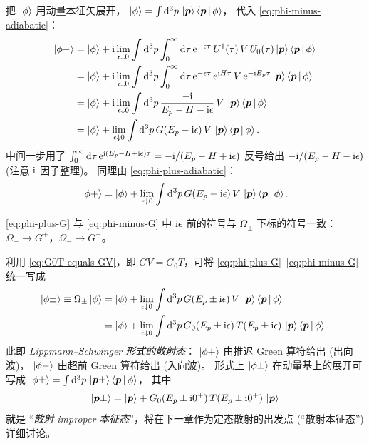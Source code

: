 把 $\ket\phi$ 用动量本征矢展开，
$\ket\phi = \int\mathrm{d}^3 p\,\ket{\bm p}\left\langle \bm p \,\middle|\, \phi \right\rangle$，
代入 \eqref{eq:phi-minus-adiabatic}：
\begin{align}
  \ket{\phi-}
  &= \ket\phi + \mathrm{i}\lim_{\epsilon\downarrow 0}\int\mathrm{d}^3 p\int_0^{\infty}\mathrm{d}\tau\,
     \mathrm{e}^{-\epsilon\tau}\,U^\dagger(\tau)\,V\,U_0(\tau)\ket{\bm p}\left\langle \bm p \,\middle|\, \phi \right\rangle\notag\\
  &= \ket\phi + \mathrm{i}\lim_{\epsilon\downarrow 0}\int\mathrm{d}^3 p\int_0^{\infty}\mathrm{d}\tau\,
     \mathrm{e}^{-\epsilon\tau}\,\mathrm{e}^{\mathrm{i} H\tau}\,V\,
     \mathrm{e}^{-\mathrm{i} E_p \tau}\ket{\bm p}\left\langle \bm p \,\middle|\, \phi \right\rangle\notag\\
  &= \ket\phi + \mathrm{i}\lim_{\epsilon\downarrow 0}\int\mathrm{d}^3 p\,
     \frac{-\mathrm{i}}{E_p - H -\mathrm{i}\epsilon}\,V\,\ket{\bm p}\left\langle \bm p \,\middle|\, \phi \right\rangle\notag\\
  &= \ket\phi + \lim_{\epsilon\downarrow 0}\int\mathrm{d}^3 p\,
     G(E_p-\mathrm{i}\epsilon)\,V\,\ket{\bm p}\left\langle \bm p \,\middle|\, \phi \right\rangle.\label{eq:phi-minus-G}
\end{align}
中间一步用了 $\int_0^\infty\mathrm{d}\tau\,\mathrm{e}^{\mathrm{i}(E_p-H+\mathrm{i}\epsilon)\tau}
=-\mathrm{i}/(E_p-H+\mathrm{i}\epsilon)$ 反号给出 $-\mathrm{i}/(E_p-H-\mathrm{i}\epsilon)$
(注意 $\mathrm{i}$ 因子整理)。
同理由 \eqref{eq:phi-plus-adiabatic}：
\begin{equation}\label{eq:phi-plus-G}
  \ket{\phi+} = \ket\phi + \lim_{\epsilon\downarrow 0}\int\mathrm{d}^3 p\,
     G(E_p+\mathrm{i}\epsilon)\,V\,\ket{\bm p}\left\langle \bm p \,\middle|\, \phi \right\rangle.
\end{equation}

\begin{remark}
\eqref{eq:phi-plus-G} 与 \eqref{eq:phi-minus-G} 中
$\mathrm{i}\epsilon$ 前的符号与 $\Omega_\pm$ 下标的符号一致：
$\Omega_+\to G^+$，$\Omega_-\to G^-$。
\end{remark}

利用 \eqref{eq:G0T-equals-GV}，即 $GV=G_0 T$，可将 \eqref{eq:phi-plus-G}--\eqref{eq:phi-minus-G}
统一写成
\begin{align}
  \ket{\phi\pm} \equiv \Omega_\pm\ket\phi
  &= \ket\phi + \lim_{\epsilon\downarrow 0}\int\mathrm{d}^3 p\,
     G(E_p\pm\mathrm{i}\epsilon)\,V\,\ket{\bm p}\left\langle \bm p \,\middle|\, \phi \right\rangle\notag\\
  &= \ket\phi + \lim_{\epsilon\downarrow 0}\int\mathrm{d}^3 p\,
     G_0(E_p\pm\mathrm{i}\epsilon)\,T(E_p\pm\mathrm{i}\epsilon)\,\ket{\bm p}\left\langle \bm p \,\middle|\, \phi \right\rangle.
\label{eq:phi-pm-T}
\end{align}
此即 \emph{Lippmann--Schwinger 形式的散射态}：
$\ket{\phi+}$ 由推迟 Green 算符给出 (出向波)，
$\ket{\phi-}$ 由超前 Green 算符给出 (入向波)。
形式上 $\ket{\phi\pm}$ 在动量基上的展开可写成
$\ket{\phi\pm}=\int\mathrm{d}^3 p\,\ket{\bm p\pm}\left\langle \bm p \,\middle|\, \phi \right\rangle$，
其中
\begin{equation}\label{eq:improper-pm-states}
  \ket{\bm p\pm}
  = \ket{\bm p} + G_0(E_p\pm\mathrm{i} 0^+)\,T(E_p\pm\mathrm{i} 0^+)\,\ket{\bm p}
\end{equation}
就是 ``\emph{散射 improper 本征态}''，将在下一章作为定态散射的出发点
(``散射本征态'') 详细讨论。

